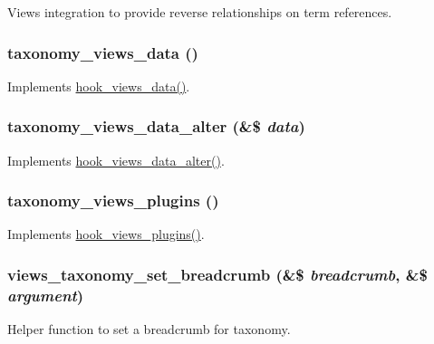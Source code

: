 Views integration to provide reverse relationships on term references. \hypertarget{taxonomy_8views_8inc_a7d924f539ca1e7da381929bec742e8fd}{
\subsubsection[{taxonomy\_\-views\_\-data}]{\setlength{\rightskip}{0pt plus 5cm}taxonomy\_\-views\_\-data ()}}
\label{taxonomy_8views_8inc_a7d924f539ca1e7da381929bec742e8fd}
Implements \hyperlink{group__views__hooks_ga227057901681e4a33e33c199c7a8c989}{hook\_\-views\_\-data()}. \hypertarget{taxonomy_8views_8inc_aa6aab8471715a703a640f25f9cfe8efb}{
\subsubsection[{taxonomy\_\-views\_\-data\_\-alter}]{\setlength{\rightskip}{0pt plus 5cm}taxonomy\_\-views\_\-data\_\-alter (\&\$ {\em data})}}
\label{taxonomy_8views_8inc_aa6aab8471715a703a640f25f9cfe8efb}
Implements \hyperlink{group__views__hooks_ga6ae0bb0d2385e03c32b57625b6d35826}{hook\_\-views\_\-data\_\-alter()}. \hypertarget{taxonomy_8views_8inc_adf4c4ae0f65e3a97003ca804bfff4c9c}{
\subsubsection[{taxonomy\_\-views\_\-plugins}]{\setlength{\rightskip}{0pt plus 5cm}taxonomy\_\-views\_\-plugins ()}}
\label{taxonomy_8views_8inc_adf4c4ae0f65e3a97003ca804bfff4c9c}
Implements \hyperlink{group__views__hooks_ga23f6e9972b2ed84fc54b7ff63f44477d}{hook\_\-views\_\-plugins()}. \hypertarget{taxonomy_8views_8inc_ae3ea861745bda984b3d544ac856012e0}{
\subsubsection[{views\_\-taxonomy\_\-set\_\-breadcrumb}]{\setlength{\rightskip}{0pt plus 5cm}views\_\-taxonomy\_\-set\_\-breadcrumb (\&\$ {\em breadcrumb}, \/  \&\$ {\em argument})}}
\label{taxonomy_8views_8inc_ae3ea861745bda984b3d544ac856012e0}
Helper function to set a breadcrumb for taxonomy. 